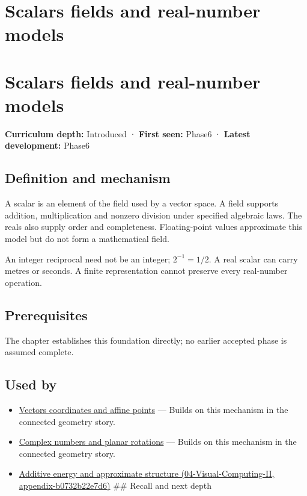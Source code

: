 \hypertarget{appendix-52051ad550fe}{}
\section*{Scalars fields and real-number models}
\section{Scalars fields and real-number models}\label{scalars-fields-and-real-number-models}

\textbf{Curriculum depth:} Introduced · \textbf{First seen:} Phase6 · \textbf{Latest development:} Phase6

\subsection{Definition and mechanism}\label{definition-and-mechanism}

A scalar is an element of the field used by a vector space. A field supports addition, multiplication and nonzero division under specified algebraic laws. The reals also supply order and completeness. Floating-point values approximate this model but do not form a mathematical field.

An integer reciprocal need not be an integer; \(2^{-1}=1/2\). A real scalar can carry metres or seconds. A finite representation cannot preserve every real-number operation.

\subsection{Prerequisites}\label{prerequisites}

The chapter establishes this foundation directly; no earlier accepted phase is assumed complete.

\subsection{Used by}\label{used-by}

\begin{itemize}
\item
  \hyperref[appendix-0659864c0aa3]{Vectors coordinates and affine points} --- Builds on this mechanism in the connected geometry story.
\item
  \hyperref[appendix-f77eadcc4a93]{Complex numbers and planar rotations} --- Builds on this mechanism in the connected geometry story.
\item
  \href{}{Additive energy and approximate structure (04-Visual-Computing-II, appendix-b0732b22e7d6)} \#\# Recall and next depth
\end{itemize}

